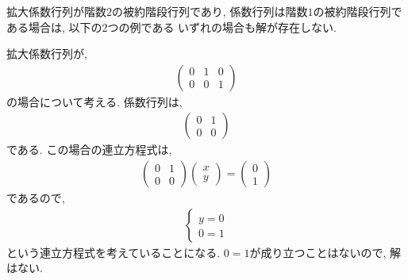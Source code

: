 拡大係数行列が階数$2$の被約階段行列であり,
係数行列は階数$1$の被約階段行列である場合は,
以下の2つの例である
いずれの場合も解が存在しない.
\begin{example}
    \label{eg:eq:reduced:3}
  拡大係数行列が,
  \begin{align*}
    \begin{pmatrix}
      0&1&0\\0&0&1
    \end{pmatrix}
  \end{align*}
  の場合について考える.
  係数行列は,
  \begin{align*}
    \begin{pmatrix}
      0&1\\0&0
    \end{pmatrix}
  \end{align*}
  である.
  この場合の連立方程式は,
  \begin{align*}
    \begin{pmatrix}
      0&1\\0&0
    \end{pmatrix}
    \begin{pmatrix}x\\y\end{pmatrix}
      =
      \begin{pmatrix}
        0\\1
      \end{pmatrix}
  \end{align*}
  であるので,
  \begin{align*}
    \begin{cases}
      y=0\\
      0=1
    \end{cases}
  \end{align*}
  という連立方程式を考えていることになる.
  $0=1$が成り立つことはないので,
  解はない.
\end{example}
